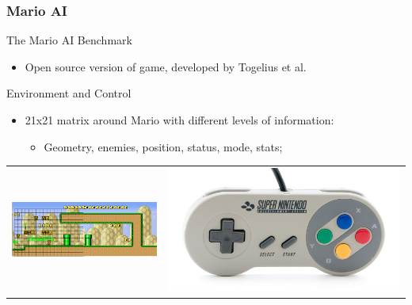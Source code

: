 \documentclass{beamer}
\begin{document}

\begin{frame}{}
	\frametitle{Mario AI}
	\begin{block}{The Mario AI Benchmark}
		\begin{itemize}
			\item Open source version of game, developed by Togelius et al.
		\end{itemize}
	\end{block}
	\begin{block}{Environment and Control}
		\begin{itemize}
			\item 21x21 matrix around Mario with different levels of information:
			\begin{itemize}
				\item Geometry, enemies, position, status, mode, stats;
			\end{itemize}
		\end{itemize}
		\begin{center}
			\begin{tabular}{cc}
			\includegraphics[width=.53\textwidth]{trapMatrix}&
			\includegraphics[width=.38\textwidth]{snesControl}\\
			\end{tabular}
		\end{center}
	\end{block}
	\vfill
\end{frame}
\end{document}
